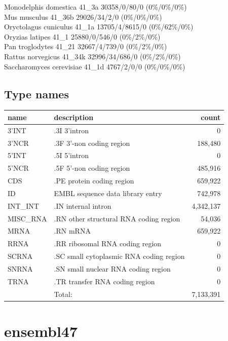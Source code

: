 \documentclass{article}
\begin{document}
\begin{Schunk}
Monodelphis domestica                   41\_3a 30358/0/80/0 (0\%/0\%/0\%)\\
Mus musculus                            41\_36b 29026/34/2/0 (0\%/0\%/0\%)\\
Oryctolagus cuniculus                   41\_1a 13705/4/8615/0 (0\%/62\%/0\%)\\
Oryzias latipes                         41\_1 25880/0/546/0 (0\%/2\%/0\%)\\
Pan troglodytes                         41\_21 32667/4/739/0 (0\%/2\%/0\%)\\
Rattus norvegicus                       41\_34k 32996/34/686/0 (0\%/2\%/0\%)\\
Saccharomyces cerevisiae                41\_1d 4767/2/0/0 (0\%/0\%/0\%)

\subsection{Type names}
\noindent\begin{tabular}{llr}
\hline \hline
name & description & count \\
\hline
3'INT  &  .3I 3'intron  &  0 \\
3'NCR  &  .3F  3'-non coding region  &  188,480 \\
5'INT  &  .5I 5'intron  &  0 \\
5'NCR  &  .5F  5'-non coding region  &  485,916 \\
CDS  &  .PE protein coding region  &  659,922 \\
ID  &  EMBL sequence data library entry  &  742,978 \\
INT\_INT  &  .IN  internal intron  &  4,342,137 \\
MISC\_RNA  &  .RN other structural RNA coding region  &  54,036 \\
MRNA  &  .RN mRNA  &  659,922 \\
RRNA  &  .RR ribosomal RNA coding region  &  0 \\
SCRNA  &  .SC small cytoplasmic RNA coding region  &  0 \\
SNRNA  &  .SN small nuclear RNA coding region  &  0 \\
TRNA  &  .TR transfer RNA coding region  &  0 \\
\hline
 & Total: & 7,133,391 \\
\hline \hline
\end{tabular}

\section{ ensembl47 }

\end{Schunk}
\end{document}

